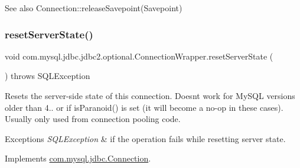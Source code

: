 \begin{DoxySeeAlso}{See also}
Connection\+::release\+Savepoint(\+Savepoint) 
\end{DoxySeeAlso}
\mbox{\label{classcom_1_1mysql_1_1jdbc_1_1jdbc2_1_1optional_1_1_connection_wrapper_af3edf0f2f10ef1647b70c9d54a9b7290}} 
\subsubsection{\texorpdfstring{reset\+Server\+State()}{resetServerState()}}
{\footnotesize\ttfamily void com.\+mysql.\+jdbc.\+jdbc2.\+optional.\+Connection\+Wrapper.\+reset\+Server\+State (\begin{DoxyParamCaption}{ }\end{DoxyParamCaption}) throws S\+Q\+L\+Exception}

Resets the server-\/side state of this connection. Doesn\textquotesingle{}t work for My\+S\+QL versions older than 4.. or if is\+Paranoid() is set (it will become a no-\/op in these cases). Usually only used from connection pooling code.


\begin{DoxyExceptions}{Exceptions}
{\em S\+Q\+L\+Exception} & if the operation fails while resetting server state. \\
\hline
\end{DoxyExceptions}


Implements \mbox{\hyperlink{interfacecom_1_1mysql_1_1jdbc_1_1_connection_ac618ee80c02d7672e277b3be75304f6e}{com.\+mysql.\+jdbc.\+Connection}}.

